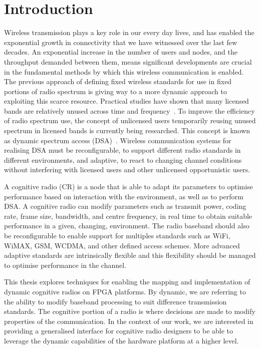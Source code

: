 \chapter{Introduction}
\label{chap:introduction}

Wireless transmission plays a key role in our every day lives, and has enabled the exponential growth in connectivity that we have witnessed over the last few decades.
An exponential increase in the number of users and nodes, and the throughput demanded between them, means significant developments are crucial in the fundamental methods by which this wireless communication is enabled.
The previous approach of defining fixed wireless standards for use in fixed portions of radio spectrum is giving way to a more dynamic approach to exploiting this scarce resource.
Practical studies have shown that many licensed bands are relatively unused across time and frequency~\cite{FCC2002}.
To improve the efficiency of radio spectrum use, the concept of unlicensed users temporarily reusing unused spectrum in licensed bands is currently being researched.
This concept is known as dynamic spectrum access (DSA)~\cite{Minden}.
Wireless communication systems for realising DSA must be reconfigurable, to support different radio standards in different environments, and adaptive, to react to changing channel conditions without interfering with licensed users and other unlicensed opportunistic users.

A cognitive radio (CR) is a node that is able to adapt its parameters to optimise performance based on interaction with the environment, as well as to perform DSA.
A cognitive radio can modify parameters such as transmit power, coding rate, frame size, bandwidth, and centre frequency, in real time to obtain suitable performance in a given, changing, environment.
The radio baseband should also be reconfigurable to enable support for multiples standards such as WiFi, WiMAX, GSM, WCDMA, and other defined access schemes.
More advanced adaptive standards are intrinsically flexible and this flexibility should be managed to optimise performance in the channel.

This thesis explores techniques for enabling the mapping and implementation of dynamic cognitive radios on FPGA platforms.
By dynamic, we are referring to the ability to modify baseband processing to suit difference transmission standards.
The cognitive portion of a radio is where decisions are made to modify properties of the communication.
In the context of our work, we are interested in providing a generalised interface for cognitive radio designers to be able to leverage the dynamic capabilities of the hardware platform at a higher level.

